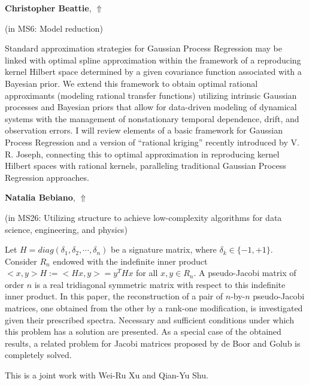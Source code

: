 \documentclass[ILAS2025-program.tex]{subfiles}
\begin{document}
\hypertarget{down0209}{}\begin{ilasabstract}
    
\textbf{Christopher Beattie},  \hfill \hyperlink{up0209}{$\Uparrow$}
    
    
(in {\color{mstitle}MS6: Model reduction})
        
\mtskip
    Standard approximation strategies for Gaussian Process Regression may be linked with optimal spline approximation within the framework of a reproducing kernel Hilbert space determined by a given covariance function associated with a Bayesian prior.   We extend this framework to obtain optimal rational approximants (modeling rational transfer functions) utilizing intrinsic Gaussian processes and Bayesian priors that allow for data-driven modeling of dynamical systems with the management of nonstationary temporal dependence, drift, and observation errors.  I will review elements of a basic framework for Gaussian Process Regression and a version of ``rational kriging'' recently introduced by V. R. Joseph,  connecting this to optimal approximation in reproducing kernel Hilbert spaces with rational kernels, paralleling traditional Gaussian Process Regression approaches.

\end{ilasabstract}
    

\hypertarget{down0060}{}\begin{ilasabstract}
    
\textbf{Natalia Bebiano},  \hfill \hyperlink{up0060}{$\Uparrow$}
    
    
(in {\color{mstitle}MS26: Utilizing structure to achieve low-complexity algorithms for data science, engineering, and physics})
        
\mtskip
    Let $H= diag(\delta_1, \delta_2, \cdots, \delta_n)$ be a signature matrix, where $\delta_k \in \{-1, +1\}$. Consider $R_n$ endowed with the indefinite inner product $< x, y>H:=< H x, y>= y^T H x$ for all $x, y \in R_n$. A pseudo-Jacobi matrix of order $n$ is a real tridiagonal symmetric matrix with respect to this indefinite inner product. In this paper, the reconstruction of a pair of $n$-by-$n$ pseudo-Jacobi matrices, one obtained from the other by a rank-one modification, is investigated given their prescribed spectra. Necessary and sufficient conditions under which this problem has a solution are presented. As a special case of the obtained results, a related problem for Jacobi matrices proposed by de Boor and Golub is completely solved.
 
This is a joint work with Wei-Ru Xu and Qian-Yu Shu.
\end{ilasabstract}
    
\end{document}
